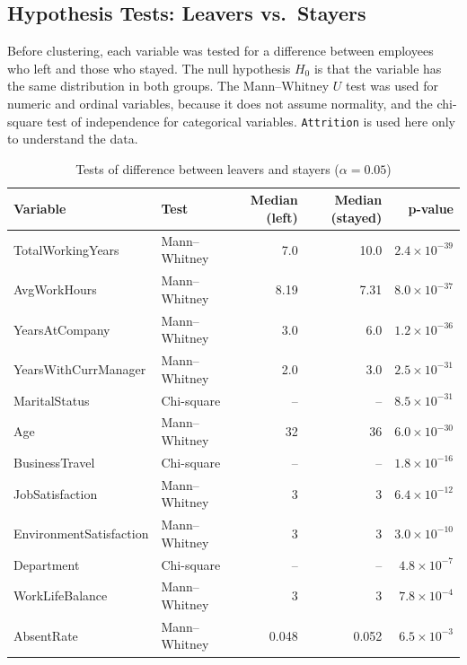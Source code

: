 \documentclass[12pt,a4paper]{article}
\begin{document}
\subsection{Hypothesis Tests: Leavers vs.\ Stayers}
\label{sec:hypothesis}

Before clustering, each variable was tested for a difference between
employees who left and those who stayed. The null hypothesis $H_0$ is that
the variable has the same distribution in both groups. The Mann--Whitney $U$
test was used for numeric and ordinal variables, because it does not assume
normality, and the chi-square test of independence for categorical variables.
\texttt{Attrition} is used here only to understand the data.

\begin{table}[H]
\centering
\caption{Tests of difference between leavers and stayers ($\alpha = 0.05$)}
\label{tab:hypothesis}
\small
\setlength{\tabcolsep}{4pt}
\begin{tabular}{llrrr}
\toprule
\textbf{Variable} & \textbf{Test} & \textbf{Median (left)} & \textbf{Median (stayed)} & \textbf{p-value}\\
\midrule
TotalWorkingYears       & Mann--Whitney & 7.0  & 10.0 & $2.4\times10^{-39}$\\
AvgWorkHours            & Mann--Whitney & 8.19 & 7.31 & $8.0\times10^{-37}$\\
YearsAtCompany          & Mann--Whitney & 3.0  & 6.0  & $1.2\times10^{-36}$\\
YearsWithCurrManager    & Mann--Whitney & 2.0  & 3.0  & $2.5\times10^{-31}$\\
MaritalStatus           & Chi-square    & --   & --   & $8.5\times10^{-31}$\\
Age                     & Mann--Whitney & 32   & 36   & $6.0\times10^{-30}$\\
BusinessTravel          & Chi-square    & --   & --   & $1.8\times10^{-16}$\\
JobSatisfaction         & Mann--Whitney & 3    & 3    & $6.4\times10^{-12}$\\
EnvironmentSatisfaction & Mann--Whitney & 3    & 3    & $3.0\times10^{-10}$\\
Department              & Chi-square    & --   & --   & $4.8\times10^{-7}$\\
WorkLifeBalance         & Mann--Whitney & 3    & 3    & $7.8\times10^{-4}$\\
AbsentRate              & Mann--Whitney & 0.048 & 0.052 & $6.5\times10^{-3}$\\

\end{tabular}
\end{table}
\end{document}
